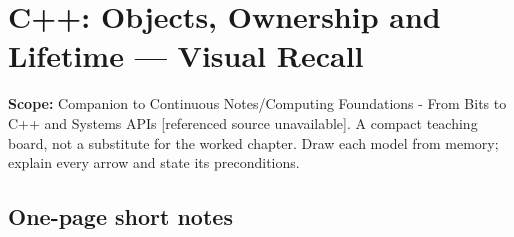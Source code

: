 \hypertarget{appendix-960160274237}{}
\section{C++: Objects, Ownership and Lifetime --- Visual Recall}\label{appendix-960160274237-c-objects-ownership-and-lifetime-visual-recall}

\textbf{Scope:} Companion to {Continuous Notes/Computing Foundations - From Bits to C++ and Systems APIs {[}referenced source unavailable{]}}. A compact teaching board, not a substitute for the worked chapter. Draw each model from memory; explain every arrow and state its preconditions.

\subsection{One-page short notes}\label{appendix-960160274237-one-page-short-notes}

